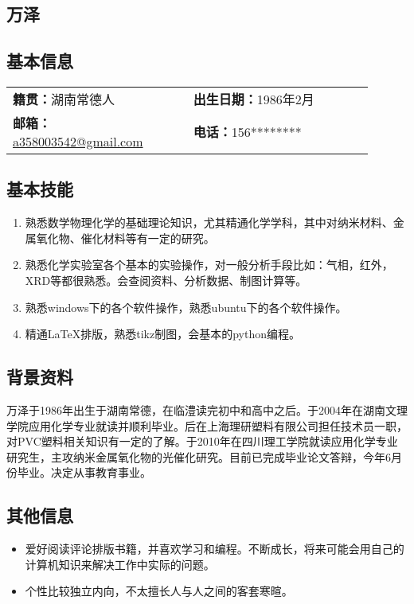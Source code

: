 \documentclass[11pt,oneside]{book}
\begin{document}
\begin{common-format}

\chapter{万泽}
\vspace{15pt}

\section{基本信息}

\noindent
\begin{tabular}{p{0.45\linewidth} p{0.45\linewidth}}
\textbf{籍贯：}湖南常德人 & \textbf{出生日期：}1986年2月 \\ 
\textbf{邮箱：}\href{mailto: a358003542@gmail.com}{a358003542@gmail.com} & \textbf{电话：}156******** \\ 
\end{tabular} 


\section{基本技能}
\vspace{-5mm}
\begin{enumerate}
\item 熟悉数学物理化学的基础理论知识，尤其精通化学学科，其中对纳米材料、金属氧化物、催化材料等有一定的研究。
\item 熟悉化学实验室各个基本的实验操作，对一般分析手段比如：气相，红外，XRD等都很熟悉。会查阅资料、分析数据、制图计算等。
\item 熟悉windows下的各个软件操作，熟悉ubuntu下的各个软件操作。
\item 精通\LaTeX 排版，熟悉tikz制图，会基本的python编程。
\end{enumerate}


\section{背景资料}
万泽于1986年出生于湖南常德，在临澧读完初中和高中之后。于2004年在湖南文理学院应用化学专业就读并顺利毕业。后在上海理研塑料有限公司担任技术员一职，对PVC塑料相关知识有一定的了解。于2010年在四川理工学院就读应用化学专业研究生，主攻纳米金属氧化物的光催化研究。目前已完成毕业论文答辩，今年6月份毕业。决定从事教育事业。

\section{其他信息}
\vspace{-5mm}
\begin{itemize}
\item 爱好阅读评论排版书籍，并喜欢学习和编程。不断成长，将来可能会用自己的计算机知识来解决工作中实际的问题。
\item 个性比较独立内向，不太擅长人与人之间的客套寒暄。
\end{itemize}



\end{common-format}
\end{document}
